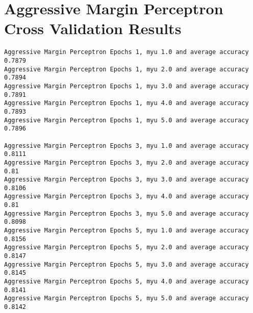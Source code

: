 \section{Aggressive Margin Perceptron Cross Validation Results}
\begin{Verbatim}[fontsize=\small]
Aggressive Margin Perceptron Epochs 1, myu 1.0 and average accuracy 0.7879
Aggressive Margin Perceptron Epochs 1, myu 2.0 and average accuracy 0.7894
Aggressive Margin Perceptron Epochs 1, myu 3.0 and average accuracy 0.7891
Aggressive Margin Perceptron Epochs 1, myu 4.0 and average accuracy 0.7893
Aggressive Margin Perceptron Epochs 1, myu 5.0 and average accuracy 0.7896

Aggressive Margin Perceptron Epochs 3, myu 1.0 and average accuracy 0.8111
Aggressive Margin Perceptron Epochs 3, myu 2.0 and average accuracy 0.81
Aggressive Margin Perceptron Epochs 3, myu 3.0 and average accuracy 0.8106
Aggressive Margin Perceptron Epochs 3, myu 4.0 and average accuracy 0.81
Aggressive Margin Perceptron Epochs 3, myu 5.0 and average accuracy 0.8098
Aggressive Margin Perceptron Epochs 5, myu 1.0 and average accuracy 0.8156
Aggressive Margin Perceptron Epochs 5, myu 2.0 and average accuracy 0.8147
Aggressive Margin Perceptron Epochs 5, myu 3.0 and average accuracy 0.8145
Aggressive Margin Perceptron Epochs 5, myu 4.0 and average accuracy 0.8141
Aggressive Margin Perceptron Epochs 5, myu 5.0 and average accuracy 0.8142
\end{Verbatim}

